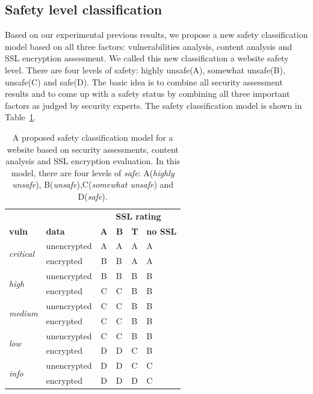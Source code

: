 \documentclass[conference]{IEEEtran}
\begin{document}
\subsection{Safety level classification}

Based on our experimental previous results, we propose a new safety
classification model based on all three factors: vulnerabilities
analysis, content analysis and SSL encryption assessment. We called
this new classification a website safety level. There are four levels
of safety: highly unsafe(A), somewhat unsafe(B), unsafe(C) and
safe(D).  The basic idea is to combine all security assessment results
and to come up with a safety status by combining all three important
factors as judged by security experts. The safety classification model 
is shown in
Table~\ref{tab:class}.

\begin{table}[thbp]
  \caption{A proposed safety classification model for a website based on
    security assessments, content analysis and SSL encryption
    evaluation. In this model, there are four levels of
    \emph{safe}: A(\emph{highly unsafe}), B(\emph{unsafe}),C(\emph{somewhat unsafe}) and D(\emph{safe}).}
	\label{tab:class}
	\centering
	\begin{tabular}{llclll}
          &  & \multicolumn{4}{c}{\textbf{SSL rating}} \\ \cline{3-6} 
          \textbf{vuln}& \textbf{data} & \textbf{A} & \textbf{B} & \textbf{T} &
                                                                                \textbf{no SSL} \\ \hline
          \multirow{2}{*}{\textit{critical}} & unencrypted & A & A & A & A\\
          & encrypted & B & B & A & A \\ \hline
          \multirow{2}{*}{\textit{high}} & unencrypted & B & B & B & B \\
          & encrypted & C & C & B & B \\ \hline
          \multirow{2}{*}{\textit{medium}} & unencrypted & C & C & B & B \\
          & encrypted & C & C & B & B \\ \hline
          \multirow{2}{*}{\textit{low}} & unencrypted & C & C & B & B \\ &
                                                                           encrypted & D & D & C & B \\ \hline
          \multirow{2}{*}{\textit{info}} & unencrypted & D & D & C & C \\
          \cline{2-6}
          & encrypted & D & D & D & C \\ \hline
	\end{tabular}
	\end{table}
\end{document}
